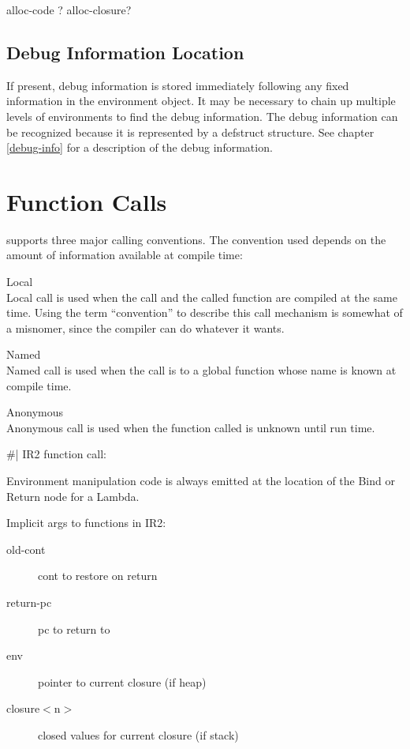 {\begin{itemize, spread 0, spacing 1}
alloc-code ?
alloc-closure?

\subsection{Debug Information Location}

If present, debug information is stored immediately following any fixed
information in the environment object.  It may be necessary to chain up
multiple levels of environments to find the debug information.  The debug
information can be recognized because it is represented by a defstruct
structure.  See chapter \ref{debug-info} for a description of the debug
information.

\section{Function Calls}

\ccl supports three major calling conventions.  The convention used
depends on the amount of information available at compile time:
\begin{description}
Local\\Local call is used when the call and the called function are
compiled at the same time.  Using the term ``convention'' to describe this
call mechanism is somewhat of a misnomer, since the compiler can do
whatever it wants.

Named\\Named call is used when the call is to a global function whose name
is known at compile time.

Anonymous\\Anonymous call is used when the function called is unknown until
run time.
\end{description}

\#|
IR2 function call:

Environment manipulation code is always emitted at the location of the Bind or
Return node for a Lambda. 

Implicit args to functions in IR2:
\begin{description}
\item[old-cont] cont to restore on return
\item[return-pc] pc to return to
\item[env] pointer to current closure (if heap)
\item[closure$<$n$>$] closed values for current closure (if stack)
\end{description}


\end{itemize, spread 0, spacing 1}}
